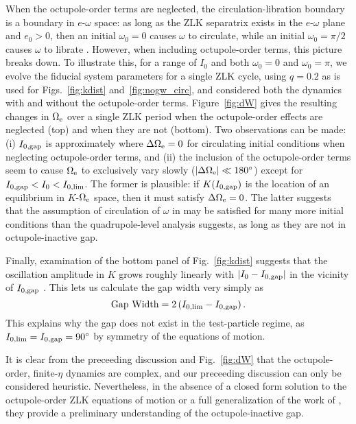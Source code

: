 \documentclass[
        fleqn,
        usenatbib,
    ]{mnras}
\newcommand*{\abs}[1]{\left|#1\right|}
\newcommand*{\p}[1]{\left(#1\right)}
\begin{document}
When the octupole-order terms are neglected, the circulation-libration
boundary is a boundary in $e$-$\omega$ space: as long as the ZLK separatrix
exists in the $e$-$\omega$ plane and $e_0 > 0$, then an initial $\omega_0 = 0$
causes $\omega$ to circulate, while an initial $\omega_0 = \pi/2$ causes
$\omega$ to librate \citep[e.g.,][]{kinoshita, shevchenko2016lidov}. However,
when including octupole-order terms, this picture breaks down. To illustrate
this, for a range of $I_0$ and both $\omega_0 = 0$ and $\omega_0 = \pi$, we
evolve the fiducial system parameters for a single ZLK cycle, using $q = 0.2$ as
is used for Figs.~\ref{fig:kdist} and~\ref{fig:nogw_circ}, and considered both
the dynamics with and without the octupole-order terms. Figure~\ref{fig:dW}
gives the resulting changes in $\Omega_{\rm e}$ over a single ZLK period when
the octupole-order effects are neglected (top) and when they are not (bottom).
Two observations can be made: (i) $I_{\rm 0, gap}$ is approximately where
$\Delta \Omega_{\rm e} = 0$ for circulating initial conditions when neglecting
octupole-order terms, and (ii) the inclusion of the octupole-order terms seem to
cause $\Omega_{\rm e}$ to exclusively vary slowly ($\abs{\Delta \Omega_{\rm e}}
\ll 180^\circ$) except for $I_{\rm 0, gap} < I_0 < I_{0, \lim}$. The former is
plausible: if $K(I_{\rm 0, gap})$ is the location of an equilibrium in
$K$-$\Omega_{\rm e}$ space, then it must satisfy $\Delta \Omega_{\rm e} = 0$.
The latter suggests that the assumption of circulation of $\omega$ in
\citet{katz2011long} may be satisfied for many more initial conditions than the
quadrupole-level analysis suggests, as long as they are not in octupole-inactive
gap.

Finally, examination of the bottom panel of Fig.~\ref{fig:kdist} suggests that
the oscillation amplitude in $K$ grows roughly linearly with $\abs{I_0 - I_{\rm
0, gap}}$ in the vicinity of $I_{\rm 0, gap}$ \citep[this may be because, in the
test-particle limit, librating $\omega$ give oscillation amplitudes in $K$ that
are higher-order in $K$ and $\Omega_{\rm e}$, as pointed out
by][]{katz2011long}. This lets us calculate the gap width very simply as
\begin{equation}
    \text{Gap Width} = 2\p{I_{0, \lim} - I_{\rm 0, gap}}.
\end{equation}
This explains why the gap does not exist in the test-particle regime, as $I_{0,
\lim} = I_{\rm 0, gap} = 90^\circ$ by symmetry of the equations of motion.

It is clear from the preceeding discussion and Fig.~\ref{fig:dW} that the
octupole-order, finite-$\eta$ dynamics are complex, and our preceeding
discussion can only be considered heuristic. Nevertheless, in the absence of a
closed form solution to the octupole-order ZLK equations of motion or a full
generalization of the work of \citet{katz2011long}, they provide a preliminary
understanding of the octupole-inactive gap.
\end{document}
